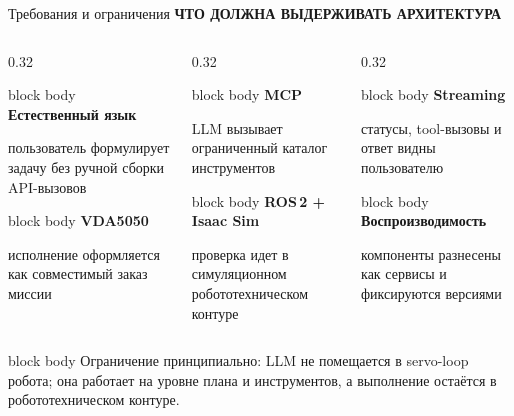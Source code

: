 \documentclass[aspectratio=169,11pt]{beamer}
\newcommand{\tightkeybox}[2]{%
  \begin{beamercolorbox}[wd=0.98\linewidth,sep=0.09cm]{block body}
    {\color{hseblue}\bfseries\small #1}\par
    \vspace{0.02cm}
    {\scriptsize #2}
  \end{beamercolorbox}
}
\newcommand{\sectiontag}[1]{%
  {\scriptsize\bfseries\color{hsegray}\MakeUppercase{#1}}\par\vspace{0.06cm}
}
\begin{document}
\begin{frame}{Требования и ограничения}
  \sectiontag{Что должна выдерживать архитектура}
  \begin{columns}[T,onlytextwidth]
    \begin{column}{0.32\textwidth}
      \begin{minipage}[t][1.80cm][t]{\linewidth}
        \tightkeybox{Естественный язык}{пользователь формулирует задачу без ручной сборки API-вызовов}
      \end{minipage}
      \vspace{0.12cm}
      \tightkeybox{VDA5050}{исполнение оформляется как совместимый заказ миссии}
    \end{column}
    \begin{column}{0.32\textwidth}
      \begin{minipage}[t][1.80cm][t]{\linewidth}
        \tightkeybox{MCP}{LLM вызывает ограниченный каталог инструментов}
      \end{minipage}
      \vspace{0.12cm}
      \tightkeybox{ROS\,2 + Isaac Sim}{проверка идет в симуляционном робототехническом контуре}
    \end{column}
    \begin{column}{0.32\textwidth}
      \begin{minipage}[t][1.80cm][t]{\linewidth}
        \tightkeybox{Streaming}{статусы, tool-вызовы и ответ видны пользователю}
      \end{minipage}
      \vspace{0.12cm}
      \tightkeybox{Воспроизводимость}{компоненты разнесены как сервисы и фиксируются версиями}
    \end{column}
  \end{columns}
  \vspace{0.28cm}
  \begin{beamercolorbox}[wd=\linewidth,sep=0.14cm]{block body}
    \small Ограничение принципиально: LLM не помещается в servo-loop робота;
    она работает на уровне плана и инструментов, а выполнение остаётся в робототехническом контуре.
  \end{beamercolorbox}
\end{frame}
\end{document}
